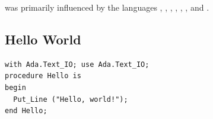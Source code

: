 \documentclass[../Languages.tex]{subfiles}
\begin{document}
 was primarily influenced by the languages , ,
, , , , and .

\subsection{Hello World}
\label{sub:hello_world}

\begin{verbatim}
with Ada.Text_IO; use Ada.Text_IO;
procedure Hello is
begin
  Put_Line ("Hello, world!");
end Hello;
\end{verbatim}

\newpage
\end{document}

